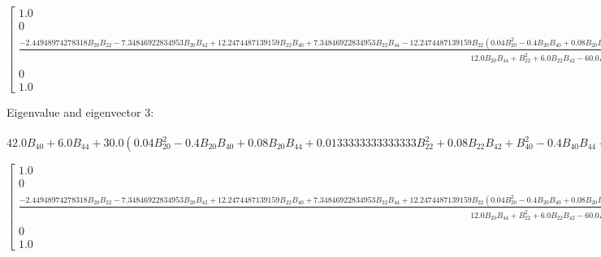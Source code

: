 \documentclass[8pt]{report}
\begin{document}
\begin{math}
\left[\begin{matrix}1.0\\0\\\frac{- 2.44948974278318 B_{20} B_{22} - 7.34846922834953 B_{20} B_{42} + 12.2474487139159 B_{22} B_{40} + 7.34846922834953 B_{22} B_{44} - 12.2474487139159 B_{22} \left(0.04 B_{20}^{2} - 0.4 B_{20} B_{40} + 0.08 B_{20} B_{44} + 0.0133333333333333 B_{22}^{2} + 0.08 B_{22} B_{42} + B_{40}^{2} - 0.4 B_{40} B_{44} + 0.12 B_{42}^{2} + 0.04 B_{44}^{2}\right)^{0.5} + 36.7423461417477 B_{40} B_{42} + 22.0454076850486 B_{42} B_{44} - 36.7423461417477 B_{42} \left(0.04 B_{20}^{2} - 0.4 B_{20} B_{40} + 0.08 B_{20} B_{44} + 0.0133333333333333 B_{22}^{2} + 0.08 B_{22} B_{42} + B_{40}^{2} - 0.4 B_{40} B_{44} + 0.12 B_{42}^{2} + 0.04 B_{44}^{2}\right)^{0.5}}{12.0 B_{20} B_{44} + B_{22}^{2} + 6.0 B_{22} B_{42} - 60.0 B_{40} B_{44} + 9.0 B_{42}^{2} + 12.0 B_{44}^{2} - 60.0 B_{44} \left(0.04 B_{20}^{2} - 0.4 B_{20} B_{40} + 0.08 B_{20} B_{44} + 0.0133333333333333 B_{22}^{2} + 0.08 B_{22} B_{42} + B_{40}^{2} - 0.4 B_{40} B_{44} + 0.12 B_{42}^{2} + 0.04 B_{44}^{2}\right)^{0.5}}\\0\\1.0\end{matrix}\right]
\end{math}

Eigenvalue and eigenvector 3:

\begin{math}
42.0 B_{40} + 6.0 B_{44} + 30.0 \left(0.04 B_{20}^{2} - 0.4 B_{20} B_{40} + 0.08 B_{20} B_{44} + 0.0133333333333333 B_{22}^{2} + 0.08 B_{22} B_{42} + B_{40}^{2} - 0.4 B_{40} B_{44} + 0.12 B_{42}^{2} + 0.04 B_{44}^{2}\right)^{0.5}
\end{math}

\begin{math}
\left[\begin{matrix}1.0\\0\\\frac{- 2.44948974278318 B_{20} B_{22} - 7.34846922834953 B_{20} B_{42} + 12.2474487139159 B_{22} B_{40} + 7.34846922834953 B_{22} B_{44} + 12.2474487139159 B_{22} \left(0.04 B_{20}^{2} - 0.4 B_{20} B_{40} + 0.08 B_{20} B_{44} + 0.0133333333333333 B_{22}^{2} + 0.08 B_{22} B_{42} + B_{40}^{2} - 0.4 B_{40} B_{44} + 0.12 B_{42}^{2} + 0.04 B_{44}^{2}\right)^{0.5} + 36.7423461417477 B_{40} B_{42} + 22.0454076850486 B_{42} B_{44} + 36.7423461417477 B_{42} \left(0.04 B_{20}^{2} - 0.4 B_{20} B_{40} + 0.08 B_{20} B_{44} + 0.0133333333333333 B_{22}^{2} + 0.08 B_{22} B_{42} + B_{40}^{2} - 0.4 B_{40} B_{44} + 0.12 B_{42}^{2} + 0.04 B_{44}^{2}\right)^{0.5}}{12.0 B_{20} B_{44} + B_{22}^{2} + 6.0 B_{22} B_{42} - 60.0 B_{40} B_{44} + 9.0 B_{42}^{2} + 12.0 B_{44}^{2} + 60.0 B_{44} \left(0.04 B_{20}^{2} - 0.4 B_{20} B_{40} + 0.08 B_{20} B_{44} + 0.0133333333333333 B_{22}^{2} + 0.08 B_{22} B_{42} + B_{40}^{2} - 0.4 B_{40} B_{44} + 0.12 B_{42}^{2} + 0.04 B_{44}^{2}\right)^{0.5}}\\0\\1.0\end{matrix}\right]
\end{math}
\end{document}
